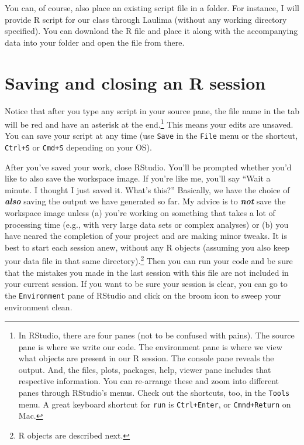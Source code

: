 \documentclass[
]{book}
\begin{document}
You can, of course, also place an existing script file in a folder. For instance, I will provide R script for our class through Laulima (without any working directory specified). You can download the R file and place it along with the accompanying data into your folder and open the file from there.

\hypertarget{saving}{%
\chapter{Saving and closing an R session}\label{saving}}

Notice that after you type any script in your source pane, the file name in the tab will be red and have an asterisk at the end.\footnote{In RStudio, there are four panes (not to be confused with pains). The source pane is where we write our code. The environment pane is where we view what objects are present in our R session. The console pane reveals the output. And, the files, plots, packages, help, viewer pane includes that respective information. You can re-arrange these and zoom into different panes through RStudio's menus. Check out the shortcuts, too, in the \texttt{Tools} menu. A great keyboard shortcut for \texttt{run} is \texttt{Ctrl+Enter}, or \texttt{Cmnd+Return} on Mac.} This means your edits are unsaved. You can save your script at any time (use \texttt{Save} in the \texttt{File} menu or the shortcut, \texttt{Ctrl+S} or \texttt{Cmd+S} depending on your OS).

After you've saved your work, close RStudio. You'll be prompted whether you'd like to also save the workspace image. If you're like me, you'll say ``Wait a minute. I thought I just saved it. What's this?'' Basically, we have the choice of \textbf{\emph{also}} saving the output we have generated so far. My advice is to \textbf{\emph{not}} save the workspace image unless (a) you're working on something that takes a lot of processing time (e.g., with very large data sets or complex analyses) or (b) you have neared the completion of your project and are making minor tweaks. It is best to start each session anew, without any R objects (assuming you also keep your data file in that same directory).\footnote{R objects are described next.} Then you can run your code and be sure that the mistakes you made in the last session with this file are not included in your current session. If you want to be sure your session is clear, you can go to the \texttt{Environment} pane of RStudio and click on the broom icon to sweep your environment clean.
\end{document}
